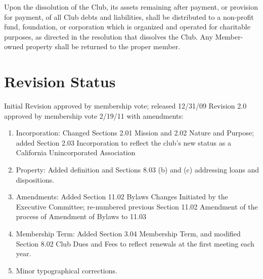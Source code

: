 \documentclass{bylaws}
\begin{document}
Upon the dissolution of the Club, its assets remaining after payment, or provision for payment, of all Club debts and liabilities, shall be distributed to a non-profit fund, foundation, or corporation which is organized and operated for charitable purposes, as directed in the resolution that dissolves the Club. Any Member-owned property shall be returned to the proper member.


\section*{Revision Status}
Initial Revision approved by membership vote; released 12/31/09
Revision 2.0 approved by membership vote 2/19/11 with amendments:
\begin{enumerate}
    \item Incorporation: Changed Sections 2.01 Mission and 2.02 Nature and Purpose; added Section 2.03 Incorporation to reflect the club’s new status as a California Unincorporated Association
    \item Property: Added definition and Sections 8.03 (b) and (c) addressing loans and dispositions.
    \item Amendments: Added Section 11.02 Bylaws Changes Initiated by the Executive Committee; re-numbered previous Section 11.02 Amendment of the process of Amendment of Bylaws to 11.03
    \item Membership Term: Added Section 3.04 Membership Term, and modified Section 8.02 Club Dues and Fees to reflect renewals at the first meeting each year.
    \item Minor typographical corrections.
\end{enumerate}
\end{document}
